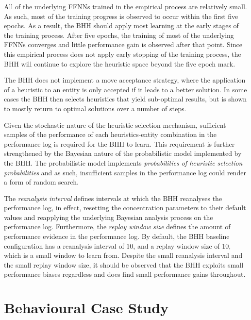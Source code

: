 All of the underlying \acp{FFNN} trained in the empirical process are relatively small. As such, most of the training progress is observed to occur within the first five epochs. As a result, the \acs{BHH} should apply most learning at the early stages of the training process. After five epochs, the training of most of the underlying \acp{FFNN} converges and little performance gain is observed after that point. Since this empirical process does not apply early stopping of the training process, the \acs{BHH} will continue to explore the heuristic space beyond the five epoch mark.

The \acs{BHH} does not implement a move acceptance strategy, where the application of a heuristic to an entity is only accepted if it leads to a better solution. In some cases the \acs{BHH} then selects heuristics that yield sub-optimal results, but is shown to mostly return to optimal solutions over a number of steps.

Given the stochastic nature of the heuristic selection mechanism, sufficient samples of the performance of each heuristics-entity combination in the performance log is required for the \acs{BHH} to learn. This requirement is further strengthened by the Bayesian nature of the probabilistic model implemented by the \acs{BHH}. The probabilistic model implements \textit{probabilities of heuristic selection probabilities} and as such, insufficient samples in the performance log could render a form of random search.

The \textit{reanalysis interval} defines intervals at which the \acs{BHH} reanalyses the performance log, in effect, resetting the concentration parameters to their default values and reapplying the underlying Bayesian analysis process on the performance log. Furthermore, the \textit{replay window size} defines the amount of performance evidence in the performance log. By default, the \acs{BHH} baseline configuration has a reanalysis interval of 10, and a replay window size of 10, which is a small window to learn from. Despite the small reanalysis interval and the small replay window size, it should be observed that the \acs{BHH} exploits small performance biases regardless and does find small performance gains throughout.

\section{Behavioural Case Study}\label{sec:results:case_study}


